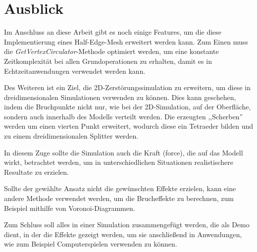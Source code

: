 \section{Ausblick}
Im Anschluss an diese Arbeit gibt es noch einige Features, um die diese Implementierung eines Half-Edge-Mesh erweitert werden kann. Zum Einen muss die \textit{GetVertexCirculator}-Methode optimiert werden, um eine konstante Zeitkomplexit\"at bei allen Grundoperationen zu erhalten, damit es in Echtzeitanwendungen verwendet werden kann. 

Des Weiteren ist ein Ziel, die 2D-Zerst\"orungssimulation zu erweitern, um diese in dreidimensionalen Simulationen verwenden zu k\"onnen. Dies kann geschehen, indem die Bruchpunkte nicht nur, wie bei der 2D-Simulation, auf der Oberfl\"ache, sondern auch innerhalb des Modells verteilt werden. Die erzeugten ,,Scherben'' werden um einen vierten Punkt erweitert, wodurch diese ein Tetraeder bilden und zu einem dreidimensionalen Splitter werden. 

In diesem Zuge sollte die Simulation auch die Kraft (force), die auf das Modell wirkt, betrachtet werden, um in unterschiedlichen Situationen realistischere Resultate zu erzielen.

Sollte der gew\"ahlte Ansatz nicht die gew\"unschten Effekte erzielen, kann eine andere Methode verwendet werden, um die Brucheffekte zu berechnen, zum Beispiel mithilfe von Voronoi-Diagrammen. 

Zum Schluss soll alles in einer Simulation zusammengef\"ugt werden, die als Demo dient, in der die Effekte gezeigt werden, um sie anschlie{\ss}end in Anwendungen, wie zum Beispiel Computerspielen verwenden zu k\"onnen.